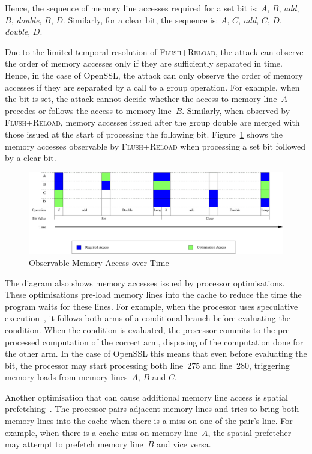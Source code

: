 \documentclass{llncs}
\begin{document}
Hence, the sequence of memory line accesses required for a set bit is: $A$, $B$, \textit{add}, $B$, \textit{double}, $B$, $D$.
Similarly, for a clear bit, the sequence is: $A$, $C$, \textit{add}, $C$, $D$, \textit{double}, $D$.

Due to the limited temporal resolution of \textsc{Flush+Reload}, the attack can observe the order of memory accesses only
if they are sufficiently separated in time.
Hence, in the case of OpenSSL, the attack can only observe the order of memory accesses if they are separated by a call
to a group operation.
For example, when the bit is set, the attack cannot decide whether the access to memory line~$A$ precedes or follows the access
to memory line~$B$.
Similarly, when observed by \textsc{Flush+Reload}, memory accesses issued after the group double are merged with those 
issued at the start of processing the following bit.
Figure~\ref{dgm:temporal} shows the memory accesses observable by \textsc{Flush+Reload} when processing a set bit followed by
a clear bit.

\begin{figure}[htb]
\centering\includegraphics[width=\columnwidth]{images/temporal}
\caption{Observable Memory Access over Time\label{dgm:temporal}}
\end{figure}

The diagram also shows memory accesses issued by processor optimisations.
These optimisations pre-load memory lines into the cache to reduce the time the program waits for these lines.
For example, when the processor uses speculative execution~\cite{uht95disjoint}, it follows both arms of a conditional
branch before evaluating the condition.
When the condition is evaluated, the processor commits to the pre-processed computation of the correct arm,
disposing of the computation done for the other arm. 
In the case of OpenSSL this means that even before evaluating the bit, 
the processor may start processing both line~275 and line~280, triggering memory loads from memory lines~$A$, $B$ and $C$.

Another optimisation that can cause additional memory line access is spatial prefetching~\cite{intel12optimization}.
The processor pairs adjacent memory lines and tries to bring both memory lines into the cache
when there is a miss on one of the pair's line.
For example, when there is a cache miss on memory line~$A$, the spatial prefetcher may attempt to prefetch memory line~$B$
and vice versa.
\end{document}
